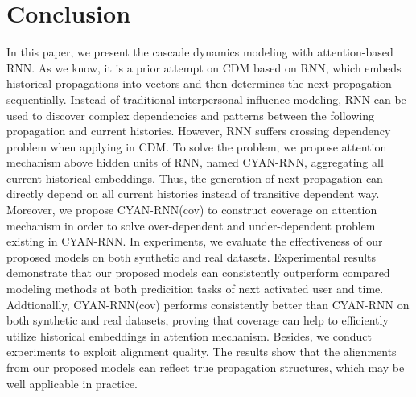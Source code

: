 \section{Conclusion}

In this paper, we present the cascade dynamics modeling with attention-based
RNN. As we know, it is a prior attempt on CDM based on RNN, which embeds
historical propagations into vectors and then determines the next propagation
sequentially.
Instead of traditional interpersonal influence modeling, RNN can
be used to discover complex dependencies and patterns between the following
propagation and current histories. 
However, RNN suffers crossing dependency problem when applying
in CDM. To solve the problem, we propose attention mechanism
above hidden units of RNN, named CYAN-RNN, aggregating all current historical
embeddings. Thus, the generation of next propagation can directly depend on all
current histories instead of transitive dependent way. Moreover, we propose
CYAN-RNN(cov) to construct coverage on attention mechanism in order to solve
over-dependent and under-dependent problem existing in CYAN-RNN. In experiments,
we evaluate the effectiveness of our proposed models on both synthetic and real
datasets. Experimental results demonstrate that our proposed models can
consistently outperform compared modeling methods at both predicition tasks of
next activated user and time. Addtionallly, CYAN-RNN(cov) performs
consistently better than CYAN-RNN on both synthetic and real datasets, proving
that coverage can help to efficiently utilize historical embeddings in attention
mechanism. Besides, we conduct experiments to exploit alignment quality. The
results show that the alignments from our proposed models can reflect
true propagation structures, which may be well applicable in practice.

% 

